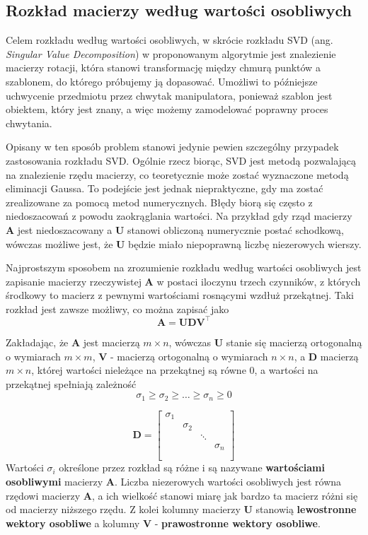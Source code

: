 \documentclass{article}
\begin{document}
\subsection*{\LARGE{Rozkład macierzy według wartości osobliwych}} 

Celem rozkładu według wartości osobliwych, w skrócie rozkładu SVD (ang. \emph{Singular Value Decomposition}) w proponowanym algorytmie jest znalezienie macierzy rotacji, która stanowi transformację między chmurą punktów a szablonem, do którego próbujemy ją dopasować. Umożliwi to późniejsze uchwycenie przedmiotu przez chwytak manipulatora, ponieważ szablon jest obiektem, który jest znany, a więc możemy zamodelować poprawny proces chwytania.

Opisany w ten sposób problem stanowi jedynie pewien szczególny przypadek zastosowania rozkładu SVD. Ogólnie rzecz biorąc, SVD jest metodą pozwalającą na znalezienie rzędu macierzy, co teoretycznie może zostać wyznaczone metodą eliminacji Gaussa. To podejście jest jednak niepraktyczne, gdy ma zostać zrealizowane za pomocą metod numerycznych. Błędy biorą się często z niedoszacowań z powodu zaokrąglania wartości. Na przykład gdy rząd macierzy $\mathbf{A}$ jest niedoszacowany a $\mathbf{U}$ stanowi obliczoną numerycznie postać schodkową, wówczas możliwe jest, że $\mathbf{U}$ będzie miało niepoprawną liczbę niezerowych wierszy.

Najprostszym sposobem na zrozumienie rozkładu według wartości osobliwych jest zapisanie macierzy rzeczywistej $\mathbf{A}$ w postaci iloczynu trzech czynników, z których środkowy to macierz z pewnymi wartościami rosnącymi wzdłuż przekątnej. Taki rozkład jest zawsze możliwy, co można zapisać jako
\[\mathbf{A = UDV^\top} \]

Zakładając, że $\mathbf{A}$ jest macierzą $m \times n$, wówczas $\mathbf{U}$ stanie się macierzą ortogonalną o wymiarach $m \times m$, $\mathbf{V}$ - macierzą ortogonalną o wymiarach $n \times n$, a $\mathbf{D}$ macierzą $m \times n$, której wartości nieleżące na przekątnej są równe 0, a wartości na przekątnej spełniają zależność
\[\sigma_1 \geq \sigma_2 \geq \ldots \geq \sigma_n \geq 0\]

\[
\mathbf{D} = \begin{bmatrix}
\sigma_1 & & & \\
& \sigma_2 & & \\
& & \ddots & \\
& & & \sigma_n \\\\
\end{bmatrix}
\]
Wartości $\sigma_i$ określone przez rozkład są różne i są nazywane \textbf{wartościami osobliwymi} macierzy $\mathbf{A}$. Liczba niezerowych wartości osobliwych jest równa rzędowi macierzy $\mathbf{A}$, a ich wielkość stanowi miarę jak bardzo ta macierz różni się od macierzy niższego rzędu. Z kolei kolumny macierzy $\mathbf{U}$ stanowią \textbf{lewostronne wektory osobliwe} a kolumny $\mathbf{V}$ - \textbf{prawostronne wektory osobliwe}.
\end{document}
